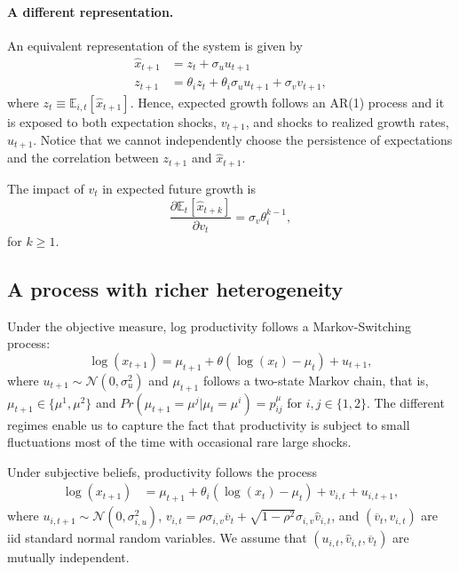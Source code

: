 \paragraph{A different representation.} An equivalent representation of the system is given by
\begin{align}
    \hat{x}_{t+1} &= z_{t} + \sigma_u u_{t+1}\\
    z_{t+1} &= \theta_i z_{t} + \theta_i \sigma_u u_{t+1}+ \sigma_{v} v_{t+1},
\end{align}
where $z_t \equiv \mathbb{E}_{i,t}[\hat{x}_{t+1}]$. Hence, expected growth follows an AR(1) process and it is exposed to both expectation shocks, $v_{t+1}$, and shocks to realized growth rates, $u_{t+1}$. Notice that we cannot independently choose the persistence of expectations and the correlation between $z_{t+1}$ and $\hat{x}_{t+1}$.

The impact of $v_t$ in expected future growth is
\begin{equation}
    \frac{\partial \mathbb{E}_t[\hat{x}_{t+k}]}{\partial v_t} = \sigma_v \theta_i^{k-1},
\end{equation}
for $k \geq 1$.

\subsection{A process with richer heterogeneity}

Under the objective measure, log productivity follows a Markov-Switching process:
\begin{equation}
    \log(x_{t+1}) = \mu_{t+1} + \theta ( \log (x_{t}) - \mu_t) + u_{t+1},
\end{equation}
where $u_{t+1} \sim \mathcal{N}(0, \sigma_u^2)$ and 
$\mu_{t+1}$ follows a two-state Markov chain, that is, $\mu_{t+1}\in \{\mu^1, \mu^2\}$ and $Pr(\mu_{t+1} = \mu^j|\mu_t = \mu^i) = p^\mu_{ij}$ for $i,j \in \{1,2\}$. 
The different regimes enable us to capture the fact that productivity is subject to small fluctuations most of the time with occasional rare large shocks.

Under subjective beliefs, productivity follows the process
\begin{align}
    \log(x_{t+1})  &= \mu_{t+1} + \theta_i (\log (x_{t}) - \mu_t) + v_{i,t}+ u_{i,t+1},
\end{align}
where $u_{i,t+1} \sim \mathcal{N}(0, \sigma_{i,u}^2)$, $v_{i,t} = \rho \sigma_{i,v} \overline{v}_t + \sqrt{1-\rho^2} \sigma_{i,v}\hat{v}_{i,t} $, and $(\overline{v}_t,v_{i,t})$ are iid standard normal random variables. We assume that $(u_{i,t}, \hat{v}_{i,t}, \overline{v}_{t})$ are mutually independent.

